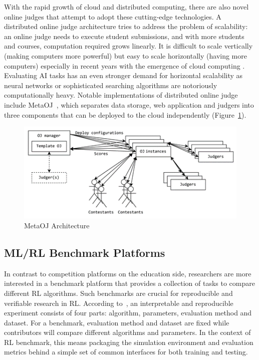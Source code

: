 With the rapid growth of cloud and distributed computing, there are also novel online judges that attempt to adopt these cutting-edge technologies. A distributed online judge architecture tries to address the problem of scalability: an online judge needs to execute student submissions, and with more students and courses, computation required grows linearly. It is difficult to scale vertically (making computers more powerful) but easy to scale horizontally (having more computers) especially in recent years with the emergence of cloud computing \parencite{RN17}. Evaluating AI tasks has an even stronger demand for horizontal scalability as neural networks or sophisticated searching algorithms are notoriously computationally heavy. Notable implementations of distributed online judge include MetaOJ~\parencite{metaoj}, which separates data storage, web application and judgers into three components that can be deployed to the cloud independently (Figure~\ref{fig:metaoj}).

\begin{figure}[H]
    \centering
    \includegraphics{images/metaoj.png}
    \caption{MetaOJ Architecture \parencite{metaoj}}
    \label{fig:metaoj}
\end{figure}

\subsection{ML/RL Benchmark Platforms}
\label{ss:intro-rl-benchmark-platforms}
In contrast to competition platforms on the education side, researchers are more interested in a benchmark platform that provides a collection of tasks to compare different RL algorithms. Such benchmarks are crucial for reproducible and verifiable research in RL. According to~\textcite{RN20}, an interpretable and reproducible experiment consists of four parts: algorithm, parameters, evaluation method and dataset. For a benchmark, evaluation method and dataset are fixed while contributors will compare different algorithms and parameters. In the context of RL benchmark, this means packaging the simulation environment and evaluation metrics behind a simple set of common interfaces for both training and testing.

